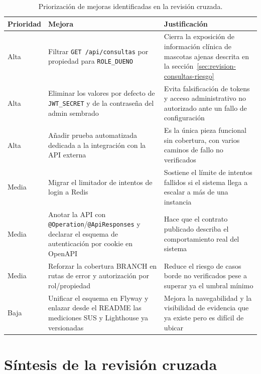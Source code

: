 \begin{table}[H]
  \centering
  \small
  \caption{Priorizaci\'on de mejoras identificadas en la revisi\'on
    cruzada.}
  \label{tab:revision-priorizacion}
  \begin{tabular}{@{}p{1.6cm}p{5.6cm}p{7.4cm}@{}}
    \toprule
    Prioridad & Mejora & Justificaci\'on \\
    \midrule
    Alta & Filtrar \texttt{GET~/api/consultas} por propiedad para
      \texttt{ROLE\_DUENO} & Cierra la exposici\'on de informaci\'on
      cl\'inica de mascotas ajenas descrita en la
      secci\'on~\ref{sec:revision-consultas-riesgo} \\
    Alta & Eliminar los valores por defecto de \texttt{JWT\_SECRET} y de la
      contrase\~na del admin sembrado & Evita falsificaci\'on de tokens y
      acceso administrativo no autorizado ante un fallo de configuraci\'on \\
    Alta & A\~nadir prueba automatizada dedicada a la integraci\'on con la
      API externa & Es la \'unica pieza funcional sin cobertura, con varios
      caminos de fallo no verificados \\
    Media & Migrar el limitador de intentos de login a Redis & Sostiene el
      l\'imite de intentos fallidos si el sistema llega a escalar a m\'as
      de una instancia \\
    Media & Anotar la API con \texttt{@Operation}/\texttt{@ApiResponses} y
      declarar el esquema de autenticaci\'on por cookie en OpenAPI & Hace
      que el contrato publicado describa el comportamiento real del sistema \\
    Media & Reforzar la cobertura BRANCH en rutas de error y autorizaci\'on
      por rol/propiedad & Reduce el riesgo de casos borde no verificados
      pese a superar ya el umbral m\'inimo \\
    Baja & Unificar el esquema en Flyway y enlazar desde el README las
      mediciones SUS y Lighthouse ya versionadas & Mejora la navegabilidad
      y la visibilidad de evidencia que ya existe pero es dif\'icil de
      ubicar \\
    \bottomrule
  \end{tabular}
\end{table}

\section{S\'intesis de la revisi\'on cruzada}
\label{sec:revision-sintesis}

